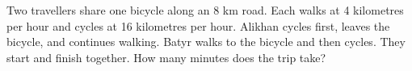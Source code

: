 Two travellers share one bicycle along an 8 km road. Each walks at 4 kilometres per hour and cycles at 16 kilometres per hour. Alikhan cycles first, leaves the bicycle, and continues walking. Batyr walks to the bicycle and then cycles. They start and finish together. How many minutes does the trip take?
